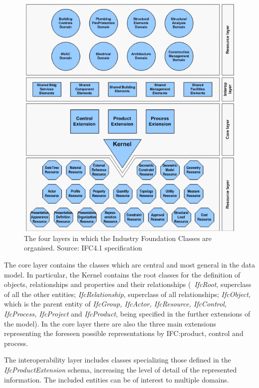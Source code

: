 \begin{figure}[ht!]
	\begin{center}
		\includegraphics[width=2\columnwidth]{figs/IFC4LayeredArchitecture.png}
		\caption{{The four layers in which the Industry Foundation Classes are organised. Source: IFC4.1 specification}}%
		\label{fig:ifclayers}
	\end{center}
\end{figure}

The core layer contains the classes which are central and most general in the data model.
In particular, the Kernel contains the root classes for the definition of objects, relationships and properties and their relationships (\eg\ \textit{IfcRoot}, superclass of all the other entities; \textit{IfcRelationship}, superclass of all relationships; \textit{IfcObject}, which is the parent entity of \textit{IfcGroup, IfcActor, IfcResource, IfcControl, IfcProcess, IfcProject} and \textit{IfcProduct}, being specified in the further extensions of the model).
In the core layer there are also the three main extensions representing the foreseen possible representations by IFC:\@ product, control and process.

The interoperability layer includes classes specializing those defined in the \textit{IfcProductExtension} schema, increasing the level of detail of the represented information. The included entities can be of interest to multiple domains.

